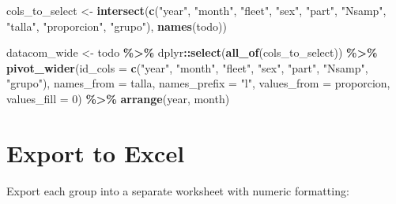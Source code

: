 \documentclass[
]{article}
\newenvironment{Shaded}{\begin{snugshade}}{\end{snugshade}}
\newcommand{\AttributeTok}[1]{\textcolor[rgb]{0.13,0.29,0.53}{#1}}
\newcommand{\DecValTok}[1]{\textcolor[rgb]{0.00,0.00,0.81}{#1}}
\newcommand{\FunctionTok}[1]{\textcolor[rgb]{0.13,0.29,0.53}{\textbf{#1}}}
\newcommand{\NormalTok}[1]{#1}
\newcommand{\OtherTok}[1]{\textcolor[rgb]{0.56,0.35,0.01}{#1}}
\newcommand{\SpecialCharTok}[1]{\textcolor[rgb]{0.81,0.36,0.00}{\textbf{#1}}}
\newcommand{\StringTok}[1]{\textcolor[rgb]{0.31,0.60,0.02}{#1}}
\begin{document}
\begin{Shaded}
\begin{Highlighting}[]
\NormalTok{cols\_to\_select }\OtherTok{\textless{}{-}} \FunctionTok{intersect}\NormalTok{(}\FunctionTok{c}\NormalTok{(}\StringTok{"year"}\NormalTok{, }\StringTok{"month"}\NormalTok{, }\StringTok{"fleet"}\NormalTok{,}
    \StringTok{"sex"}\NormalTok{, }\StringTok{"part"}\NormalTok{, }\StringTok{"Nsamp"}\NormalTok{, }\StringTok{"talla"}\NormalTok{, }\StringTok{"proporcion"}\NormalTok{,}
    \StringTok{"grupo"}\NormalTok{), }\FunctionTok{names}\NormalTok{(todo))}

\NormalTok{datacom\_wide }\OtherTok{\textless{}{-}}\NormalTok{ todo }\SpecialCharTok{\%\textgreater{}\%}
\NormalTok{    dplyr}\SpecialCharTok{::}\FunctionTok{select}\NormalTok{(}\FunctionTok{all\_of}\NormalTok{(cols\_to\_select)) }\SpecialCharTok{\%\textgreater{}\%}
    \FunctionTok{pivot\_wider}\NormalTok{(}\AttributeTok{id\_cols =} \FunctionTok{c}\NormalTok{(}\StringTok{"year"}\NormalTok{, }\StringTok{"month"}\NormalTok{, }\StringTok{"fleet"}\NormalTok{,}
        \StringTok{"sex"}\NormalTok{, }\StringTok{"part"}\NormalTok{, }\StringTok{"Nsamp"}\NormalTok{, }\StringTok{"grupo"}\NormalTok{), }\AttributeTok{names\_from =}\NormalTok{ talla,}
        \AttributeTok{names\_prefix =} \StringTok{"l"}\NormalTok{, }\AttributeTok{values\_from =}\NormalTok{ proporcion,}
        \AttributeTok{values\_fill =} \DecValTok{0}\NormalTok{) }\SpecialCharTok{\%\textgreater{}\%}
    \FunctionTok{arrange}\NormalTok{(year, month)}
\end{Highlighting}
\end{Shaded}

\section{Export to Excel}\label{export-to-excel}

Export each group into a separate worksheet with numeric formatting:
\end{document}
